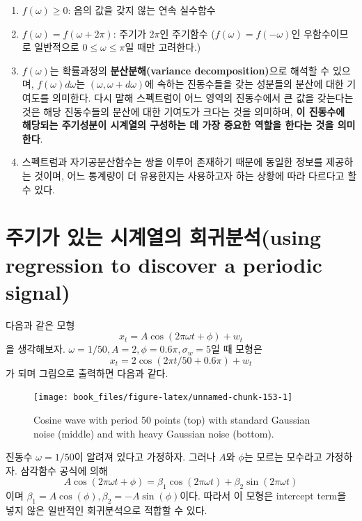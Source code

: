 \documentclass[b5paper,]{scrbook}
\theoremstyle{plain}
\theoremstyle{definition}
\numberwithin{equation}{section}
\begin{document}
\begin{enumerate}
\def\labelenumi{\arabic{enumi}.}
\item
  \(f(\omega)\geq 0\): 음의 값을 갖지 않는 연속 실수함수
\item
  \(f(\omega)=f(\omega + 2\pi)\): 주기가 \(2\pi\)인 주기함수
  (\(f(\omega)=f(-\omega)\)인 우함수이므로 일반적으로
  \(0\leq \omega \leq \pi\)일 때만 고려한다.)
\item
  \(f(\omega)\)는 확률과정의 \textbf{분산분해(variance
  decomposition)}으로 해석할 수 있으며, \(f(\omega)d\omega\)는
  \((\omega, \omega+d\omega)\)에 속하는 진동수들을 갖는 성분들의 분산에
  대한 기여도를 의미한다. 다시 말해 스펙트럼이 어느 영역의 진동수에서 큰
  값을 갖는다는 것은 해당 진동수들의 분산에 대한 기여도가 크다는 것을
  의미하며, \textbf{이 진동수에 해당되는 주기성분이 시계열의 구성하는 데
  가장 중요한 역할을 한다는 것을 의미한다}.
\item
  스펙트럼과 자기공분산함수는 쌍을 이루어 존재하기 때문에 동일한 정보를
  제공하는 것이며, 어느 통계량이 더 유용한지는 사용하고자 하는 상황에
  따라 다르다고 할 수 있다.
\end{enumerate}

\section{주기가 있는 시계열의 회귀분석(using regression to discover a
periodic
signal)}\label{---using-regression-to-discover-a-periodic-signal}

다음과 같은 모형 \[x_{t}=A\cos (2\pi\omega t + \phi) + w_{t}\] 을
생각해보자. \(\omega=1/50, A=2,\phi=0.6\pi, \sigma_{w}=5\)일 때 모형은
\[x_{t}=2\cos (2\pi t /50 + 0.6 \pi) + w_{t}\] 가 되며 그림으로 출력하면
다음과 같다.

\begin{figure}

{\centering \texttt{[image: book\_files/figure-latex/unnamed-chunk-153-1]} 

}

\caption{Cosine wave with period 50 points (top) with standard Gaussian noise (middle) and with heavy Gaussian noise (bottom).}\label{fig:unnamed-chunk-153}
\end{figure}

진동수 \(\omega=1/50\)이 알려져 있다고 가정하자. 그러나 \(A\)와
\(\phi\)는 모르는 모수라고 가정하자. 삼각함수 공식에 의해
\[A\cos (2\pi \omega t + \phi)=\beta_{1}\cos (2\pi \omega t) + \beta_{2}\sin (2\pi\omega t)\]
이며 \(\beta_{1}=A\cos(\phi), \beta_{2}=-A\sin(\phi)\)이다. 따라서 이
모형은 intercept term을 넣지 않은 일반적인 회귀분석으로 적합할 수 있다.
\end{document}
